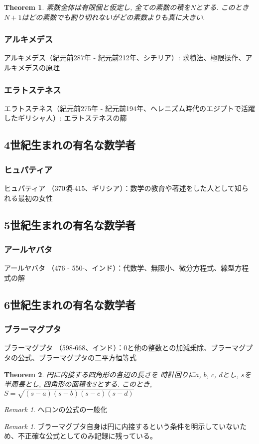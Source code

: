\documentclass[a4paper,12pt,dvipdfmx]{jsarticle}
\theoremstyle{plain}
\newtheorem{theoremX}{Theorem}
\theoremstyle{remark}  %
\newtheorem{remark}[thm]{Remark}
\theoremstyle{definition}  %
\begin{document}
\begin{theoremX}
  素数全体は有限個と仮定し, 全ての素数の積をNとする.
  このとき$N+1$はどの素数でも割り切れないがどの素数よりも真に大きい.
\end{theoremX}



\subsubsection{アルキメデス}
アルキメデス（紀元前287年 - 紀元前212年、シチリア）: 求積法、極限操作、アルキメデスの原理

\subsubsection{エラトステネス}
    エラトステネス（紀元前275年 - 紀元前194年、ヘレニズム時代のエジプトで活躍したギリシャ人）: エラトステネスの篩

\subsection{4世紀生まれの有名な数学者}
\subsubsection{ヒュパティア}
ヒュパティア
\cite{wiki:ヒュパティア}
（370頃-415、ギリシア）：数学の教育や著述をした人として知られる最初の女性    

\subsection{5世紀生まれの有名な数学者}
\subsubsection{アールヤバタ}
アールヤバタ
\cite{wiki:アーリヤバタ}
（476 - 550-、インド）：代数学、無限小、微分方程式、線型方程式の解


\subsection{6世紀生まれの有名な数学者}
\subsubsection{ブラーマグプタ}
ブラーマグプタ
\cite{wiki:ブラフマグプタ}
（598-668、インド）：0と他の整数との加減乗除、ブラーマグプタの公式、ブラーマグプタの二平方恒等式
\begin{theoremX}
  円に内接する四角形の各辺の長さを
  時計回りに$a$, $b$, $c$, $d$とし, $s$を半周長とし,
  四角形の面積を$S$とする.
  このとき, $S=\sqrt{(s-a)(s-b)(s-c)(s-d)}$
\end{theoremX}
\begin{remark}
  ヘロンの公式の一般化
\end{remark}
\begin{remark}
  ブラーマグプタ自身は円に内接するという条件を明示していないため、不正確な公式としてのみ記録に残っている。
  \cite{wiki:ブラーマグプタの公式}
\end{remark}
\end{document}
